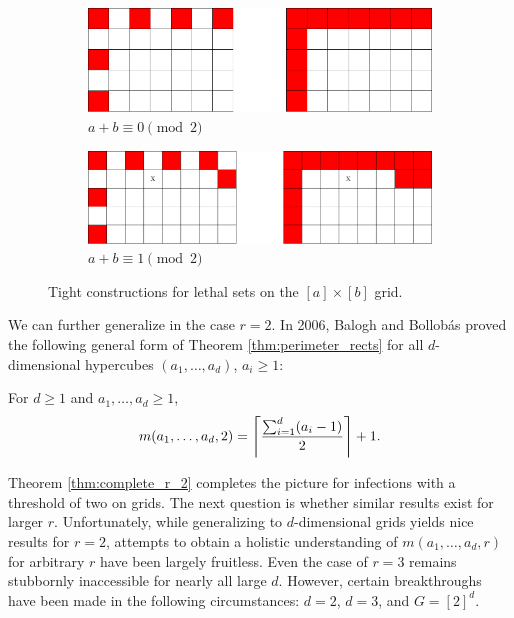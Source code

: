 \begin{figure}[]
\centering
\begin{subfigure}{0.4\textwidth}
	\includegraphics[width=\textwidth]{figures/1/5x7x1.pdf}
	\caption{$a+b \equiv 0 \pmod 2$}
	\label{fig:sa_construction_2d_a}
\end{subfigure} \hfill%
\begin{subfigure}{0.45\textwidth}
	\includegraphics[width=\textwidth]{figures/1/5x8x1.pdf}
	\caption{$a+b \equiv 1 \pmod 2$}
	\label{fig:sa_construction_2d_b}
\end{subfigure}
\caption{Tight constructions for lethal sets on the $[a] \times [b]$ grid.}
\label{fig:sa_construction_2d}
\end{figure} 

We can further generalize in the case $r=2$. In 2006, Balogh and Bollob\'as \cite{balogh:2006} proved the following general form of Theorem \ref{thm:perimeter_rects} for all $d$-dimensional hypercubes $(a_1, \dots, a_d)$, $a_i \geq 1$:

\begin{thm}[Balogh]
\label{thm:complete_r_2}
For $d \geq 1$ and $a_1, \dots, a_d \geq 1$, 
$$m(a_1, \dots, a_d, 2) = \ceil*{\frac{\sum_{i=1}^d (a_i-1)}{2}}+1.$$
\end{thm}

Theorem \ref{thm:complete_r_2} completes the picture for infections with a threshold of two on grids. The next question is whether similar results exist for larger $r$. Unfortunately, while generalizing to $d$-dimensional grids yields nice results for $r=2$, attempts to obtain a holistic understanding of $m(a_1, \dots, a_d, r)$ for arbitrary $r$ have been largely fruitless. Even the case of $r=3$ remains stubbornly inaccessible for nearly all large $d$. However, certain breakthroughs have been made in the following circumstances: $d=2$, $d=3$, and $G=[2]^d$.


